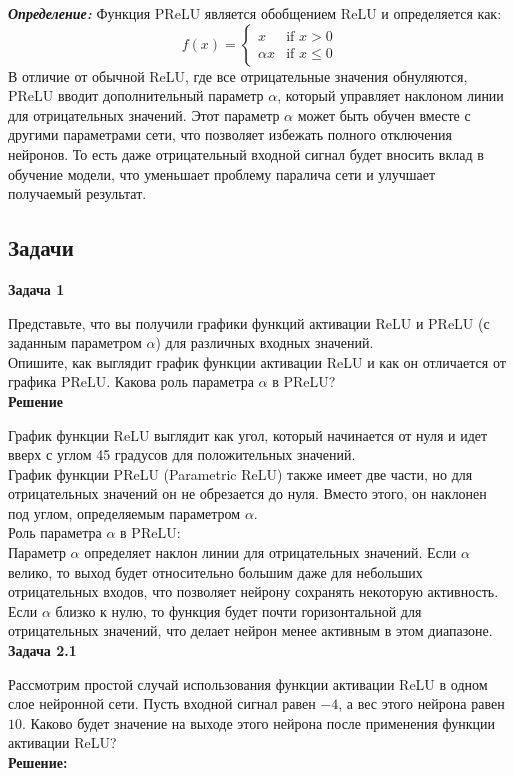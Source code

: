 \textbf{\textit{Определение:}}
Функция PReLU является обобщением ReLU и определяется как:
$$ f(x) = \begin{cases}
x & \text{if } x > 0 \\
\alpha x & \text{if } x \leq 0
\end{cases} $$
В отличие от обычной ReLU, где все отрицательные значения обнуляются, PReLU вводит дополнительный параметр $\alpha$, который управляет наклоном линии для отрицательных значений. Этот параметр $\alpha$ может быть обучен вместе с другими параметрами сети, что позволяет избежать полного отключения нейронов. То есть даже отрицательный входной сигнал будет вносить вклад в обучение модели, что уменьшает проблему паралича сети и улучшает получаемый результат.

\subsection{Задачи}
\textbf{Задача 1}

Представьте, что вы получили графики функций активации ReLU и PReLU (с заданным параметром $\alpha$) для различных входных значений.\\
Опишите, как выглядит график функции активации ReLU и как он отличается от графика PReLU. Какова роль параметра $\alpha$ в PReLU?\\
\textbf{Решение}

График функции ReLU выглядит как угол, который начинается от нуля и идет вверх с углом 45 градусов для положительных значений.\\
График функции PReLU (Parametric ReLU) также имеет две части, но для отрицательных значений он не обрезается до нуля. Вместо этого, он наклонен под углом, определяемым параметром $\alpha$. \\
Роль параметра $\alpha$ в PReLU:\\
Параметр $\alpha$ определяет наклон линии для отрицательных значений. Если $\alpha$ велико, то выход будет относительно большим даже для небольших отрицательных входов, что позволяет нейрону сохранять некоторую активность. Если $\alpha$ близко к нулю, то функция будет почти горизонтальной для отрицательных значений, что делает нейрон менее активным в этом диапазоне.\\
\textbf{Задача 2.1}

Рассмотрим простой случай использования функции активации ReLU в одном слое нейронной сети. Пусть входной сигнал равен $-4$, а вес этого нейрона равен $10$. Каково будет значение на выходе этого нейрона после применения функции активации ReLU?\\
\textbf{Решение:}

